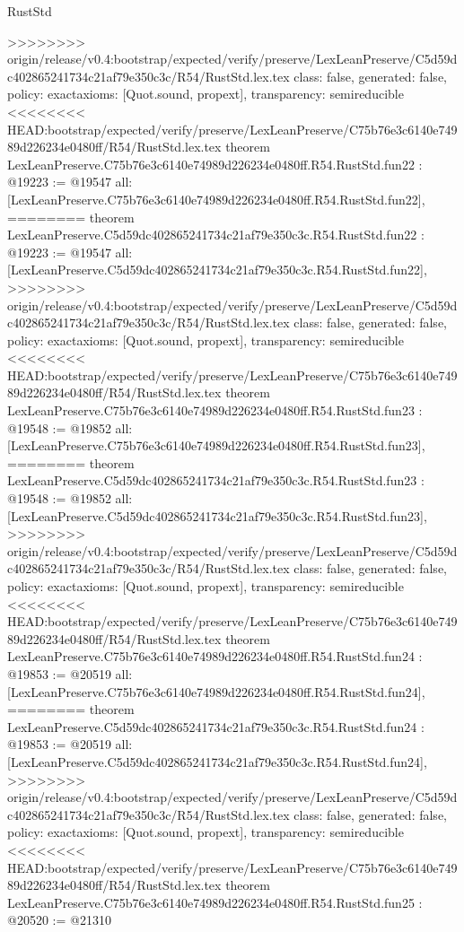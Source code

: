 \begin{lexlean}{RustStd}
\begin{coremodule}
{\begin{coremodule}
{{{{{{{{{{{{{{{{{{{{{{{{{>>>>>>>> origin/release/v0.4:bootstrap/expected/verify/preserve/LexLeanPreserve/C5d59dc402865241734c21af79e350c3c/R54/RustStd.lex.tex
  class: false,
  generated: false,
  policy: exact{axioms: [Quot.sound, propext]},
  transparency: semireducible
}
<<<<<<<< HEAD:bootstrap/expected/verify/preserve/LexLeanPreserve/C75b76e3c6140e74989d226234e0480ff/R54/RustStd.lex.tex
theorem LexLeanPreserve.C75b76e3c6140e74989d226234e0480ff.R54.RustStd.fun22 : @19223 := @19547 {
  all: [LexLeanPreserve.C75b76e3c6140e74989d226234e0480ff.R54.RustStd.fun22],
========
theorem LexLeanPreserve.C5d59dc402865241734c21af79e350c3c.R54.RustStd.fun22 : @19223 := @19547 {
  all: [LexLeanPreserve.C5d59dc402865241734c21af79e350c3c.R54.RustStd.fun22],
>>>>>>>> origin/release/v0.4:bootstrap/expected/verify/preserve/LexLeanPreserve/C5d59dc402865241734c21af79e350c3c/R54/RustStd.lex.tex
  class: false,
  generated: false,
  policy: exact{axioms: [Quot.sound, propext]},
  transparency: semireducible
}
<<<<<<<< HEAD:bootstrap/expected/verify/preserve/LexLeanPreserve/C75b76e3c6140e74989d226234e0480ff/R54/RustStd.lex.tex
theorem LexLeanPreserve.C75b76e3c6140e74989d226234e0480ff.R54.RustStd.fun23 : @19548 := @19852 {
  all: [LexLeanPreserve.C75b76e3c6140e74989d226234e0480ff.R54.RustStd.fun23],
========
theorem LexLeanPreserve.C5d59dc402865241734c21af79e350c3c.R54.RustStd.fun23 : @19548 := @19852 {
  all: [LexLeanPreserve.C5d59dc402865241734c21af79e350c3c.R54.RustStd.fun23],
>>>>>>>> origin/release/v0.4:bootstrap/expected/verify/preserve/LexLeanPreserve/C5d59dc402865241734c21af79e350c3c/R54/RustStd.lex.tex
  class: false,
  generated: false,
  policy: exact{axioms: [Quot.sound, propext]},
  transparency: semireducible
}
<<<<<<<< HEAD:bootstrap/expected/verify/preserve/LexLeanPreserve/C75b76e3c6140e74989d226234e0480ff/R54/RustStd.lex.tex
theorem LexLeanPreserve.C75b76e3c6140e74989d226234e0480ff.R54.RustStd.fun24 : @19853 := @20519 {
  all: [LexLeanPreserve.C75b76e3c6140e74989d226234e0480ff.R54.RustStd.fun24],
========
theorem LexLeanPreserve.C5d59dc402865241734c21af79e350c3c.R54.RustStd.fun24 : @19853 := @20519 {
  all: [LexLeanPreserve.C5d59dc402865241734c21af79e350c3c.R54.RustStd.fun24],
>>>>>>>> origin/release/v0.4:bootstrap/expected/verify/preserve/LexLeanPreserve/C5d59dc402865241734c21af79e350c3c/R54/RustStd.lex.tex
  class: false,
  generated: false,
  policy: exact{axioms: [Quot.sound, propext]},
  transparency: semireducible
}
<<<<<<<< HEAD:bootstrap/expected/verify/preserve/LexLeanPreserve/C75b76e3c6140e74989d226234e0480ff/R54/RustStd.lex.tex
theorem LexLeanPreserve.C75b76e3c6140e74989d226234e0480ff.R54.RustStd.fun25 : @20520 := @21310 {
}}}}}}}}}}}}}}}}}}}}}}}}}}}}
\end{coremodule}}
\end{coremodule}
\end{lexlean}
